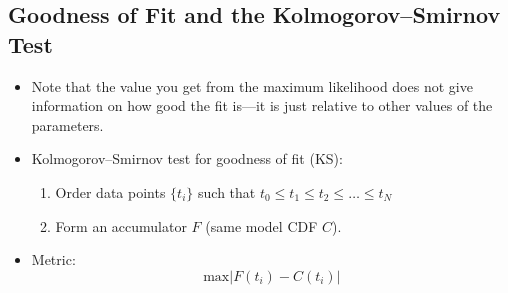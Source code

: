 \subsection{Goodness of Fit and the Kolmogorov–Smirnov Test}

\begin{itemize}
    \item Note that the value you get from the maximum likelihood does not give information on how good the fit is—it is just relative to other values of the parameters.
    \item Kolmogorov–Smirnov test for goodness of fit (KS):
          \begin{enumerate}
              \item Order data points $\{t_i\}$ such that $t_0 \leq t_1 \leq t_2 \leq \ldots \leq t_N$
              \item Form an accumulator $F$ (same model CDF $C$).
          \end{enumerate}
    \item Metric:
          \[ \text{max}|F(t_i) - C(t_i)| \]
\end{itemize}
